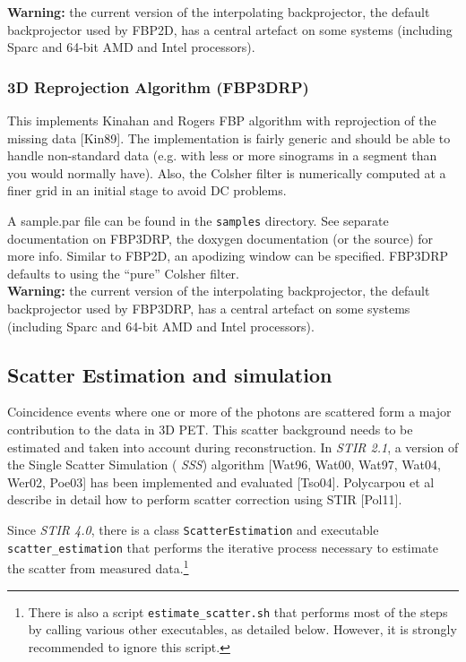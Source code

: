 \documentclass{article}
\begin{document}
\textbf{Warning:} the current version of the interpolating backprojector, 
the default backprojector used by FBP2D, has a central artefact 
on some systems (including Sparc and 64-bit AMD and Intel processors). 


\subsubsection{
3D Reprojection Algorithm (FBP3DRP)}

This implements Kinahan and Rogers FBP algorithm with reprojection 
of the missing data [Kin89]. The implementation is fairly generic 
and should be able to handle non-standard data (e.g. with less 
or more sinograms in a segment than you would normally have). 
Also, the Colsher filter is numerically computed at a finer grid 
in an initial stage to avoid DC problems.


A sample.par file can be found in the \texttt{samples} directory. See separate documentation on FBP3DRP, the doxygen documentation 
(or the source) for more info. Similar to FBP2D, an apodizing window can be specified.
FBP3DRP defaults to using the ``pure'' Colsher filter. \\
\textbf{Warning:} the current version of the interpolating backprojector, 
the default backprojector used by FBP3DRP, has a central artefact 
on some systems (including Sparc and 64-bit AMD and Intel processors).

\subsection{
Scatter Estimation and simulation}
\label{sec:scatterestimation}
Coincidence events where one or more of the photons are scattered form a major contribution to the data
in 3D PET. This scatter background needs to be estimated and taken into account during reconstruction. In
\textit{STIR 2.1}, a version of the Single Scatter Simulation ( \textit{SSS}) algorithm [Wat96, Wat00,
Wat97, Wat04, Wer02, Poe03] has been implemented and evaluated [Tso04].
Polycarpou et al describe in detail how to perform scatter correction
using STIR [Pol11].

Since \textit{STIR 4.0}, there is a class \texttt{ScatterEstimation} and executable
\texttt{scatter\_estimation} that performs the iterative process necessary to estimate
the scatter from measured data.\footnote{%
There is also a script \texttt{estimate\_scatter.sh} that performs most of the steps by
calling various other executables, as detailed below. However, it is strongly recommended to
ignore this script.}
\end{document}
